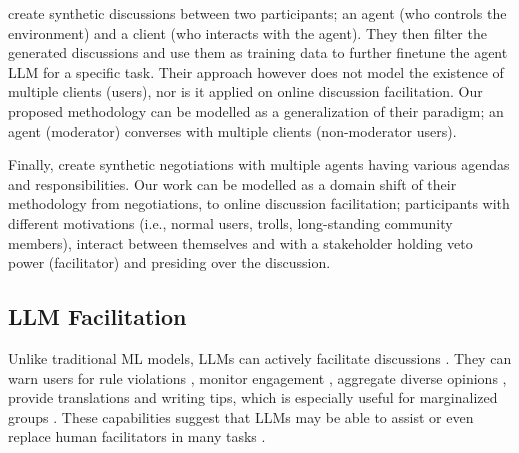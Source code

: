 \citet{ulmer2024} create synthetic discussions between two participants; an agent (who controls the environment) and a client (who interacts with the agent). They then filter the generated discussions and use them as training data to further finetune the agent \ac{LLM} for a specific task. Their approach however does not model the existence of multiple clients (users), nor is it applied on online discussion facilitation. Our proposed methodology can be modelled as a generalization of their paradigm; an agent (moderator) converses with multiple clients (non-moderator users).

Finally, \citet{abdelnabi_negotiations} create synthetic negotiations with multiple agents having various agendas and responsibilities. Our work can be modelled as a domain shift of their methodology from negotiations, to online discussion facilitation; participants with different motivations (i.e., normal users, trolls, long-standing community members), interact between themselves and with a stakeholder holding veto power (facilitator) and presiding over the discussion.


\subsection{LLM Facilitation}

Unlike traditional \ac{ML} models, \acp{LLM} can actively facilitate discussions \cite{korre2025evaluation}. They can warn users for rule violations \cite{Kumar_AbuHashem_Durumeric_2024}, monitor engagement \cite{schroeder-etal-2024-fora}, aggregate diverse opinions \cite{small-polis-llm}, provide translations and writing tips, which is especially useful for marginalized groups \cite{Tsai2024Generative}. These capabilities suggest that \acp{LLM} may be able to assist or even replace human facilitators in many tasks \cite{seering_self_moderation}.

